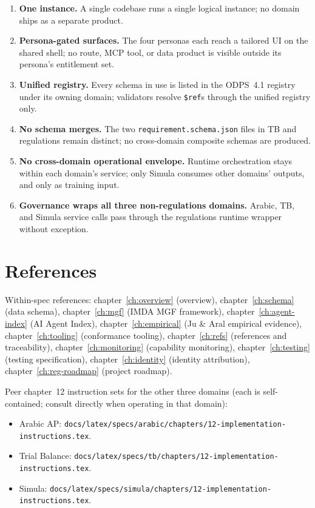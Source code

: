 \documentclass[11pt,a4paper,twoside]{report}
\begin{document}
\begin{enumerate}
\item \textbf{One instance.} A single codebase runs a single
logical instance; no domain ships as a separate product.
\item \textbf{Persona-gated surfaces.} The four personas each
reach a tailored UI on the shared shell; no route, MCP tool, or
data product is visible outside its persona's entitlement set.
\item \textbf{Unified registry.} Every schema in use is listed in
the ODPS~4.1 registry under its owning domain; validators
resolve \texttt{\$ref}s through the unified registry only.
\item \textbf{No schema merges.} The two
\texttt{requirement.schema.json} files in TB and regulations
remain distinct; no cross-domain composite schemas are produced.
\item \textbf{No cross-domain operational envelope.} Runtime
orchestration stays within each domain's service; only Simula
consumes other domains' outputs, and only as training input.
\item \textbf{Governance wraps all three non-regulations domains.}
Arabic, TB, and Simula service calls pass through the
regulations runtime wrapper without exception.
\end{enumerate}

\section{References}
\label{sec:agent-references}
Within-spec references:
chapter~\ref{ch:overview} (overview),
chapter~\ref{ch:schema} (data schema),
chapter~\ref{ch:mgf} (IMDA MGF framework),
chapter~\ref{ch:agent-index} (AI Agent Index),
chapter~\ref{ch:empirical} (Ju \& Aral empirical evidence),
chapter~\ref{ch:tooling} (conformance tooling),
chapter~\ref{ch:refs} (references and traceability),
chapter~\ref{ch:monitoring} (capability monitoring),
chapter~\ref{ch:testing} (testing specification),
chapter~\ref{ch:identity} (identity attribution),
chapter~\ref{ch:reg-roadmap} (project roadmap).

Peer chapter~12 instruction sets for the other three domains (each
is self-contained; consult directly when operating in that domain):
\begin{itemize}
\item Arabic AP:
\texttt{docs/latex/specs/arabic/chapters/12-implementation-instructions.tex}.
\item Trial Balance:
\texttt{docs/latex/specs/tb/chapters/12-implementation-instructions.tex}.
\item Simula:
\texttt{docs/latex/specs/simula/chapters/12-implementation-instructions.tex}.
\end{itemize}
\end{document}
